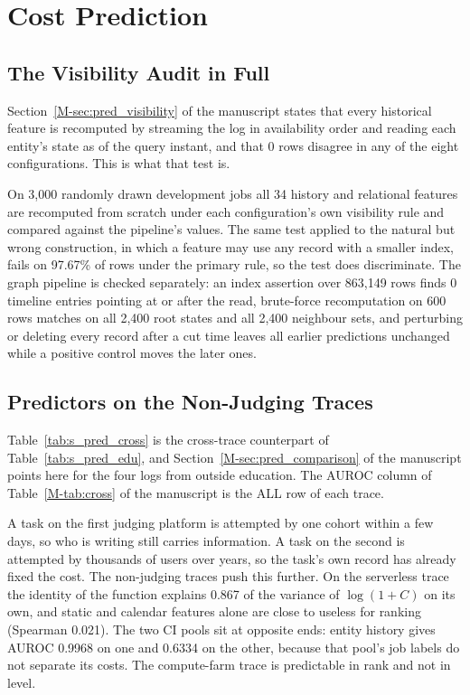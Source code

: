 \documentclass[mathematics,supfile,submit,moreauthors]{Definitions/mdpi}
\newcommand{\devnum}[1]{#1}
\begin{document}
\section{Cost Prediction}
\label{sec:supp_pred}

\subsection{The Visibility Audit in Full}

Section~\ref*{M-sec:pred_visibility} of the manuscript states that every historical feature is recomputed by
streaming the log in availability order and reading each entity's state as of the query
instant, and that \devnum{0} rows disagree in any of the eight configurations. This is
what that test is.

On \devnum{3{,}000} randomly drawn development jobs all \devnum{34} history and
relational features are recomputed from scratch under each configuration's own
visibility rule and compared against the pipeline's values. The same test applied to the
natural but wrong construction, in which a feature may use any record with a smaller
index, fails on \devnum{97.67\%} of rows under the primary rule, so the test does
discriminate. The graph pipeline is checked separately: an index assertion over
\devnum{863{,}149} rows finds \devnum{0} timeline entries pointing at or after the read,
brute-force recomputation on \devnum{600} rows matches on all \devnum{2{,}400} root
states and all \devnum{2{,}400} neighbour sets, and perturbing or deleting every record
after a cut time leaves all earlier predictions unchanged while a positive control moves
the later ones.

\subsection{Predictors on the Non-Judging Traces}

Table~\ref{tab:s_pred_cross} is the cross-trace counterpart of
Table~\ref{tab:s_pred_edu}, and Section~\ref*{M-sec:pred_comparison} of the manuscript points
here for the four logs from outside education. The AUROC column of
Table~\ref*{M-tab:cross} of the manuscript is the ALL row of each trace.

A task on the first judging platform is attempted by one cohort within a few days, so
who is writing still carries information. A task on the second is attempted by
thousands of users over years, so the task's own record has already fixed the cost. The
non-judging traces push this further. On the serverless trace the identity of the
function explains \devnum{0.867} of the variance of $\log(1+C)$ on its own, and static
and calendar features alone are close to useless for ranking (Spearman
\devnum{0.021}). The two CI pools sit at opposite ends: entity history gives AUROC
\devnum{0.9968} on one and \devnum{0.6334} on the other, because that pool's job labels
do not separate its costs. The compute-farm trace is predictable in rank and not in
level.
\end{document}
